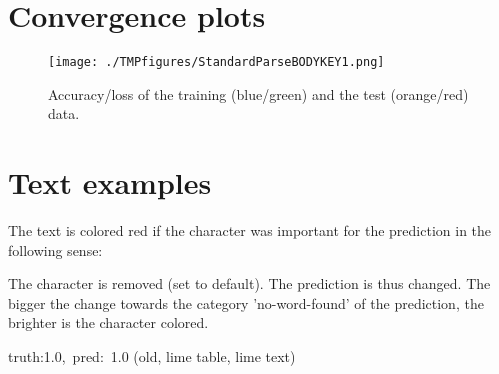 \documentclass[a4paper,10pt,twoside]{article}
\begin{document}
        \section{Convergence plots}
\begin{figure}[H]
\begin{center}
\texttt{[image: ./TMPfigures/StandardParseBODYKEY1.png]}
\end{center}
\caption{Accuracy/loss of the training (blue/green) and the test (orange/red) data.}
\end{figure}
\section{Text examples}
The text is colored red if the character was important for the prediction in the following sense:


    The character is removed (set to default). The prediction is thus changed. 
    The bigger the change towards the category 'no-word-found' of the prediction, the brighter is the character colored. 
    \vspace{1cm}
    


    

 {\footnotesize {\color[rgb]{0.6, 0.6, 0.6}truth:1.0,~pred:~1.0}} (old, lime table, lime text)\hrulefill
\end{document}
